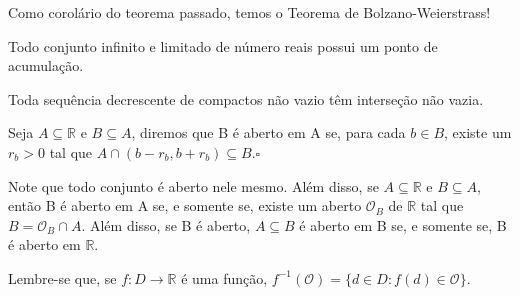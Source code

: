 \documentclass[Analysis/analysis_notes.tex]{subfiles}
\begin{document}
Como corolário do teorema passado, temos o Teorema de Bolzano-Weierstrass!
\begin{crl*}
	Todo conjunto infinito e limitado de número reais possui um ponto de acumulação.
\end{crl*}
\begin{crl*}
	Toda sequência decrescente de compactos não vazio têm interseção não vazia.
\end{crl*}
\begin{def*}
	Seja $A\subseteq{\mathbb{R}}$ e $B\subseteq{A}$, diremos que B é aberto em A se, para cada $b\in B$, existe um $r_{b}>0$ tal
	que $A\cap (b-r_{b}, b + r_{b})\subseteq{B}.\square$
\end{def*}
Note que todo conjunto é aberto nele mesmo. Além disso, se $A\subseteq{\mathbb{R}}$ e $B\subseteq{A}$, então B é aberto em A
se, e somente se, existe um aberto $\mathcal{O}_{B}$ de $\mathbb{R}$ tal que $B=\mathcal{O}_{B}\cap A.$ Além disso,
se B é aberto, $A\subseteq{B}$ é aberto em B se, e somente se, B é aberto em $\mathbb{R}.$

Lembre-se que, se $f:D\rightarrow \mathbb{R}$ é uma função, $f^{-1}(\mathcal{O})=\{d\in D: f(d)\in \mathcal{O}\}.$
\end{document}
